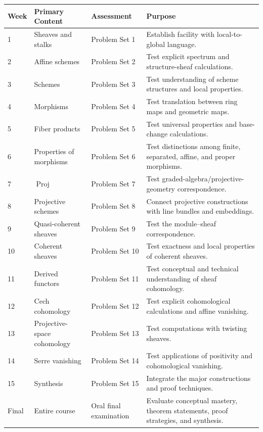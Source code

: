 \documentclass[11pt]{article}
\begin{document}
\begin{longtable}{p{}p{}p{}p{}}
\toprule
\textbf{Week} & \textbf{Primary Content} & \textbf{Assessment} & \textbf{Purpose} \\
\midrule
1 & Sheaves and stalks & Problem Set 1 & Establish facility with local-to-global language. \\
2 & Affine schemes & Problem Set 2 & Test explicit spectrum and structure-sheaf calculations. \\
3 & Schemes & Problem Set 3 & Test understanding of scheme structures and local properties. \\
4 & Morphisms & Problem Set 4 & Test translation between ring maps and geometric maps. \\
5 & Fiber products & Problem Set 5 & Test universal properties and base-change calculations. \\
6 & Properties of morphisms & Problem Set 6 & Test distinctions among finite, separated, affine, and proper morphisms. \\
7 & $\operatorname{Proj}$ & Problem Set 7 & Test graded-algebra/projective-geometry correspondence. \\
8 & Projective schemes & Problem Set 8 & Connect projective constructions with line bundles and embeddings. \\
9 & Quasi-coherent sheaves & Problem Set 9 & Test the module--sheaf correspondence. \\
10 & Coherent sheaves & Problem Set 10 & Test exactness and local properties of coherent sheaves. \\
11 & Derived functors & Problem Set 11 & Test conceptual and technical understanding of sheaf cohomology. \\
12 & Cech cohomology & Problem Set 12 & Test explicit cohomological calculations and affine vanishing. \\
13 & Projective-space cohomology & Problem Set 13 & Test computations with twisting sheaves. \\
14 & Serre vanishing & Problem Set 14 & Test applications of positivity and cohomological vanishing. \\
15 & Synthesis & Problem Set 15 & Integrate the major constructions and proof techniques. \\
Final & Entire course & Oral final examination & Evaluate conceptual mastery, theorem statements, proof strategies, and synthesis. \\
\bottomrule
\end{longtable}
\end{document}
